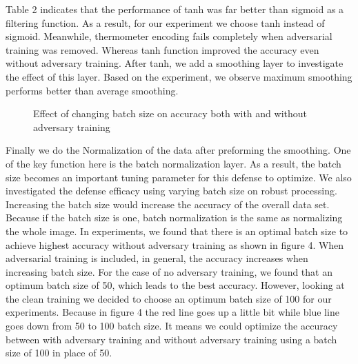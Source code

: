 \documentclass[conference]{IEEEtran}
\begin{document}
Table 2 indicates that the performance of tanh was far better than sigmoid as a filtering function. As a result, for our experiment we choose tanh instead of sigmoid. Meanwhile, thermometer encoding fails completely when adversarial training was removed. Whereas tanh function improved the accuracy even without adversary training. After tanh, we add a smoothing layer to investigate the effect of this layer. Based on the experiment, we observe maximum smoothing performs better than average smoothing. 

\begin{figure}[h]
\centering
{}
\caption{Effect of changing batch size on accuracy both with and without adversary training}
\end{figure}

Finally we do the Normalization of the data after preforming the smoothing. One of the key function here is the batch normalization layer. As a result, the batch size becomes an important tuning parameter for this defense to optimize. We also investigated the defense efficacy using varying batch size on robust processing. Increasing the batch size would increase the accuracy of the overall data set. Because if the batch size is one, batch normalization is the same as normalizing the whole image. In experiments, we found that there is an optimal batch size to achieve highest accuracy without adversary training as shown in figure 4. When adversarial training is included, in general, the accuracy increases when increasing batch size. For the case of no adversary training, we found that an optimum batch size of 50, which leads to the best accuracy. However, looking at the clean training we decided to choose an optimum batch size of 100 for our experiments. Because in figure 4 the red line goes up a little bit while blue line goes down from 50 to 100 batch size. It means we could optimize the accuracy between with adversary training and without adversary training using a batch size of 100 in place of 50.
\end{document}
